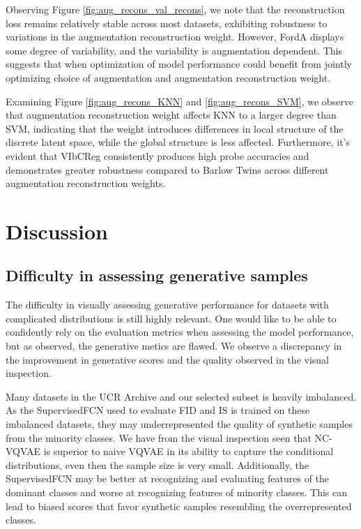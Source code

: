 \documentclass[../../thesis.tex]{subfiles}
\begin{document}
Observing Figure  \ref{fig:aug_recons_val_recons}, we note that the reconstruction loss remains relatively stable across most datasets, exhibiting robustness to variations in the augmentation reconstruction weight. However, FordA displays some degree of variability, and the variability is augmentation dependent. This suggests that when optimization of model performance could benefit from jointly optimizing choice of augmentation and augmentation reconstruction weight. \newline

Examining Figure \ref{fig:aug_recons_KNN} and \ref{fig:aug_recons_SVM}, we observe that augmentation reconstruction weight affects KNN to a larger degree than SVM, indicating that the weight introduces differences in local structure of the discrete latent space, while the global structure is less affected. Furthermore, it's evident that VIbCReg consistently produces high probe accuracies and demonstrates greater robustness compared to Barlow Twins across different augmentation reconstruction weights.

\section{Discussion}

\subsection*{Difficulty in assessing generative samples}

The difficulty in visually assessing generative performance for datasets with complicated distributions is still highly relevant. One would like to be able to confidently rely on the evaluation metrics when assessing the model performance, but as observed, the generative metics are flawed. We observe a discrepancy in the improvement in generative scores and the quality observed in the visual inspection. 
\newline

Many datasets in the UCR Archive and our selected subset is heavily imbalanced. As the SupervisedFCN used to evaluate FID and IS is trained on these imbalanced datasets, they may underrepresented the quality of synthetic samples from the minority classes. We have from the visual inspection seen that NC-VQVAE is superior to naive VQVAE in its ability to capture the conditional distributions, even then the sample size is very small. Additionally, the SupervisedFCN may be better at recognizing and evaluating features of the dominant classes and worse at recognizing features of minority classes. This can lead to biased scores that favor synthetic samples resembling the overrepresented classes.\newline
\end{document}
